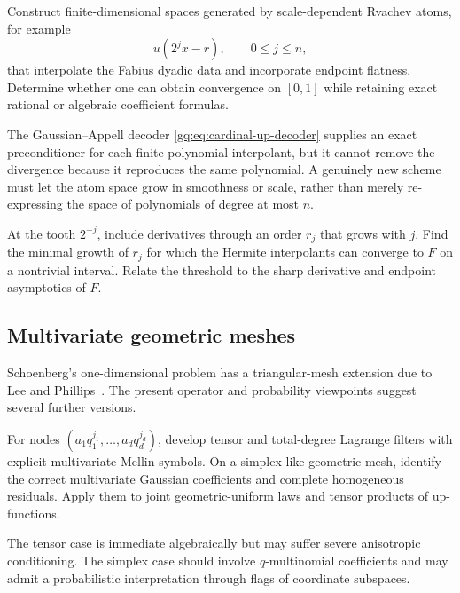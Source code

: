 \begin{problem}
\label{g2:prob:rvachev-preconditioned}
Construct finite-dimensional spaces generated by scale-dependent Rvachev
atoms, for example
\[
 u(2^jx-r),\qquad 0\le j\le n,
\]
that interpolate the Fabius dyadic data and incorporate endpoint flatness.
Determine whether one can obtain convergence on $[0,1]$ while retaining exact
rational or algebraic coefficient formulas.
\end{problem}

The Gaussian--Appell decoder \eqref{gq:eq:cardinal-up-decoder} supplies an exact
preconditioner for each finite polynomial interpolant, but it cannot remove
the divergence because it reproduces the same polynomial.  A genuinely new
scheme must let the atom space grow in smoothness or scale, rather than merely
re-expressing the space of polynomials of degree at most $n$.

\begin{problem}
\label{g2:prob:growing-hermite}
At the tooth $2^{-j}$, include derivatives through an order $r_j$ that grows
with $j$.  Find the minimal growth of $r_j$ for which the Hermite interpolants
can converge to $F$ on a nontrivial interval.  Relate the threshold to the
sharp derivative and endpoint asymptotics of $F$.
\end{problem}

\subsection{Multivariate geometric meshes}

Schoenberg's one-dimensional problem has a triangular-mesh extension due to
Lee and Phillips~\cite{LeePhillips1988}.  The present operator and probability
viewpoints suggest several further versions.

\begin{problem}
\label{g2:prob:multivariate}
For nodes
$(a_1q_1^{j_1},\ldots,a_dq_d^{j_d})$, develop tensor and total-degree
Lagrange filters with explicit multivariate Mellin symbols.  On a simplex-like
geometric mesh, identify the correct multivariate Gaussian coefficients and
complete homogeneous residuals.  Apply them to joint geometric-uniform laws
and tensor products of up-functions.
\end{problem}

The tensor case is immediate algebraically but may suffer severe anisotropic
conditioning.  The simplex case should involve $q$-multinomial coefficients
and may admit a probabilistic interpretation through flags of coordinate
subspaces.

